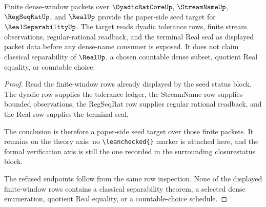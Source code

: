 \begin{theorem}
\label{thm:real-separability-seed-status-target}
Finite dense-window packets over $\DyadicRatCoreUp$, $\StreamNameUp$, $\RegSeqRatUp$, and $\RealUp$ provide the paper-side seed target for $\RealSeparabilityUp$. The target reads dyadic tolerance rows, finite stream observations, regular-rational readback, and the terminal Real seal as displayed packet data before any dense-name consumer is exposed. It does not claim classical separability of $\RealUp$, a chosen countable dense subset, quotient Real equality, or countable choice.
\end{theorem}
\begin{proof}
Read the finite-window rows already displayed by the seed status block. The dyadic row supplies the tolerance ledger, the StreamName row supplies bounded observations, the RegSeqRat row supplies regular rational readback, and the Real row supplies the terminal seal.

The conclusion is therefore a paper-side seed target over those finite packets. It remains on the theory axis: no \texttt{\textbackslash leanchecked\{\}} marker is attached here, and the formal verification axis is still the one recorded in the surrounding closurestatus block.

The refused endpoints follow from the same row inspection. None of the displayed finite-window rows contains a classical separability theorem, a selected dense enumeration, quotient Real equality, or a countable-choice schedule.
\end{proof}

